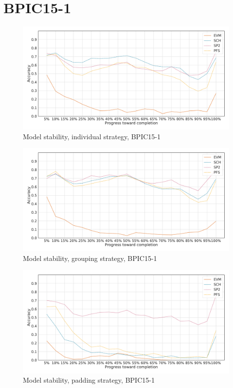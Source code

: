 \section*{BPIC15-1}\label{appendix:stability:2015-1}
\begin{figure}[!htb]
    \centering
    \includegraphics[width=\textwidth]{gfx/bpic2015_1/individual_stability.pdf}
    \caption{Model stability, individual strategy, BPIC15-1}
    \label{fig:bpic15-1-individual-stability}
\end{figure}
\begin{figure}[!htb]
    \centering
    \includegraphics[width=\textwidth]{gfx/bpic2015_1/grouped_stability.pdf}
    \caption{Model stability, grouping strategy, BPIC15-1}
    \label{fig:bpic15-1-grouped-stability}
\end{figure}
\begin{figure}[!htb]
    \centering
    \includegraphics[width=\textwidth]{gfx/bpic2015_1/padded_stability.pdf}
    \caption{Model stability, padding strategy, BPIC15-1}
    \label{fig:bpic15-1-padded-stability}
\end{figure}
